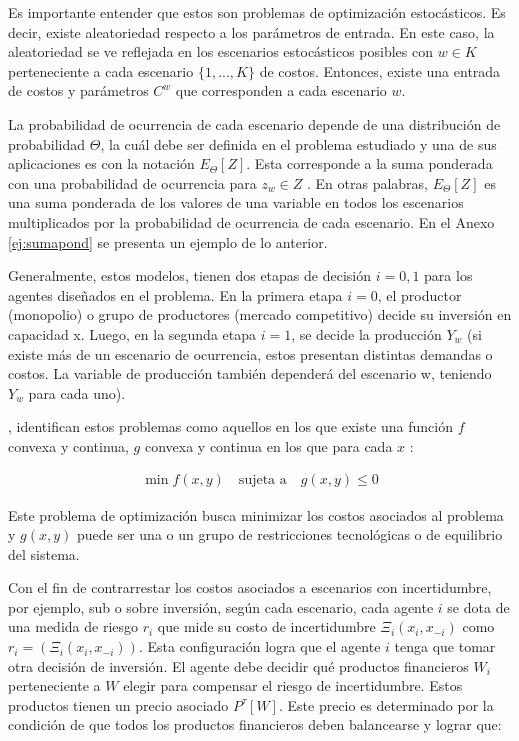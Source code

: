 Es importante entender que estos son problemas de optimización estocásticos. Es decir, existe aleatoriedad respecto a los parámetros de entrada. En este caso, la aleatoriedad se ve reflejada en los escenarios estocásticos posibles con $w \in K$  perteneciente a cada escenario $\{1,...,K\}$ de costos. Entonces, existe una entrada de costos y parámetros $C^{w}$ que corresponden a cada escenario $w$. 
\vspace{2.5mm}

La probabilidad de ocurrencia de cada escenario depende de una distribución de probabilidad $\Theta$, la cuál debe ser definida en el problema estudiado y una de sus aplicaciones es con la notación $E_{\Theta}[Z]$. Esta corresponde a la suma ponderada con una probabilidad de ocurrencia para $z_{w} \in Z$ . En otras palabras, $E_{\Theta}[Z]$ es una suma ponderada de los valores de una variable en todos los escenarios multiplicados por la probabilidad de ocurrencia de cada escenario. En el Anexo \ref{ej:sumapond} se presenta un ejemplo de lo anterior.
\vspace{2.5mm}

Generalmente, estos modelos, tienen dos etapas de decisión $i={0,1}$ para los agentes diseñados en el problema. En la primera etapa $i=0$, el productor (monopolio) o grupo de productores (mercado competitivo) decide su inversión en capacidad x. Luego, en la segunda etapa $i=1$, se decide la producción $Y_{w}$ (si existe más de un escenario de ocurrencia, estos presentan distintas demandas o costos. La variable de producción también dependerá del escenario w, teniendo $Y_{w}$ para cada uno).
\vspace{2.5mm}

 , identifican estos problemas como aquellos en los que existe una función $f$ convexa y continua, $g$ convexa y continua en los que para cada $x$ :

\begin{align}
\min f(x,y)\quad\text{sujeta a}\quad g(x,y)\leq 0
\end{align}


Este problema de optimización busca minimizar los costos asociados al problema y $g(x,y)$ puede ser una o un grupo de restricciones tecnológicas o de equilibrio del sistema.
\vspace{2.5mm}

Con el fin de contrarrestar los costos asociados a escenarios con incertidumbre, por ejemplo, sub o sobre inversión, según cada escenario, cada agente $i$ se dota de una medida de riesgo $r_{i}$ que mide su costo de incertidumbre $\Xi_{i}(x_{i},x_{-i})$ como $r_{i}=(\Xi_{i}(x_{i},x_{-i}))$. Esta configuración logra que el agente $i$ tenga que tomar otra decisión de inversión. El agente debe decidir qué productos financieros  $W_i$ perteneciente a $W$ elegir para compensar el riesgo de incertidumbre. Estos productos tienen un precio asociado $P^{\tau}[W]$. Este precio es determinado por la condición de que todos los productos financieros deben balancearse y lograr que:

